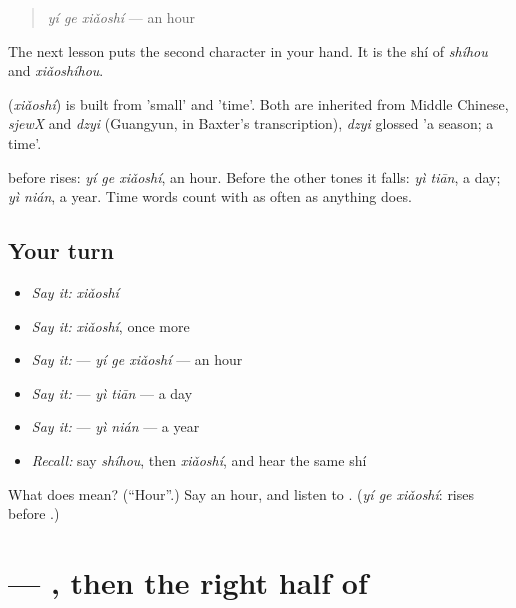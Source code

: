 \begin{quote}
\textbf{} \emph{yí ge xiǎoshí} — an hour
\end{quote}

The next lesson puts the second character in your hand. It is the shí of \emph{shíhou} and \emph{xiǎoshíhou}.

\begin{cousinweb}
\textbf{} (\emph{xiǎoshí}) is built from  'small' and  'time'. Both are inherited from Middle Chinese, \emph{sjewX} and \emph{dzyi} (Guangyun, in Baxter's transcription), \emph{dzyi} glossed 'a season; a time'.
\end{cousinweb}

\begin{grammarlens}[title={What you've built}]
 before  rises: \emph{yí ge xiǎoshí}, an hour. Before the other tones it falls: \emph{yì tiān}, a day; \emph{yì nián}, a year. Time words count with  as often as anything does.
\end{grammarlens}

\subsection*{Your turn}
\begin{itemize}
\raggedright
  \item \emph{Say it:} \emph{xiǎoshí}
  \item \emph{Say it:} \emph{xiǎoshí}, once more
  \item \emph{Say it:}  — \emph{yí ge xiǎoshí} — an hour
  \item \emph{Say it:}  — \emph{yì tiān} — a day
  \item \emph{Say it:}  — \emph{yì nián} — a year
  \item \emph{Recall:} say \emph{shíhou}, then \emph{xiǎoshí}, and hear the same shí
\end{itemize}

\begin{tcolorbox}[breakable,colback=teal!4,colframe=teal!35!black,title={Before you move on}]
What does  mean? (\textquotedblleft{}Hour\textquotedblright{}.) Say an hour, and listen to . (\emph{yí ge xiǎoshí}:  rises before .)
\end{tcolorbox}
\section[\texorpdfstring{\zh{时} (shí)}{时 (shí)}]{ — , then the right half of }

